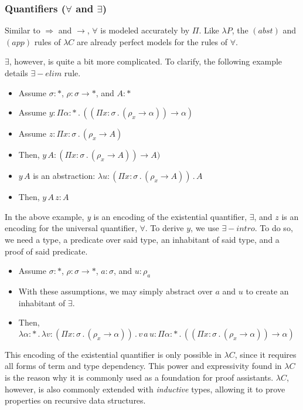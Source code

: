 \documentclass[9pt,preprint,nocopyrightspace,computermodern]{sigplanconf} %
\begin{document}
\subsubsection* {Quantifiers (\(\forall\) and \(\exists\))}
Similar to \(\Rightarrow\) and \(\rightarrow\), \(\forall\) is modeled accurately by
\(\Pi\). Like \(\lambda P\), the \((abst)\) and \((app)\) rules of \(\lambda C\) are
already perfect models for the rules of \(\forall\).

\(\exists\), however, is quite a bit more complicated. To clarify, the following
example details \(\exists\!\!-\!\!elim\) rule.
\begin{itemize}
\item Assume \(\sigma:*\),\(\,\,\rho:\sigma\rightarrow *\), and \(A:*\)
\item Assume \(y:\Pi\alpha:*\,.\,((\Pi x:\sigma\,.\,(\rho_x\rightarrow\alpha))\rightarrow\alpha)\)
\item Assume \(z:\Pi x:\sigma\,.\,(\rho_x\rightarrow A)\)
\item Then, \(y\,A:(\Pi x:\sigma\,.\,(\rho_x\rightarrow A))\rightarrow A)\)
\item \(y\,A\) is an abstraction: \(\lambda u:(\Pi x:\sigma\,.\,(\rho_x\rightarrow A))\,.\,A\)
\item Then, \(y\,A\,z:A\)
\end{itemize}
In the above example, \textit{y} is an encoding of the existential quantifier,
\(\exists\), and \(z\) is an encoding for the universal quantifier, \(\forall\).
To derive \(y\), we use \(\exists\!\!-\!\!intro\). To do so, we need a type,
a predicate over said type, an inhabitant of said type, and a proof of said predicate.
\begin{itemize}
\item Assume \(\sigma:*\),\(\,\,\rho:\sigma\rightarrow *\),\(\,\,a:\sigma\), and \(u:\rho_a\)
\item With these assumptions, we may simply abstract over \(a\) and \(u\) to
  create an inhabitant of \(\exists\).
\item Then, \(\lambda\alpha:*\,.\,\lambda v:(\Pi x:\sigma\,.\,(\rho_x\rightarrow\alpha))\,.\,v\,a\,u :\Pi\alpha:*\,.\,((\Pi x:\sigma\,.\,(\rho_x\rightarrow\alpha))\rightarrow\alpha)\)
\end{itemize}
This encoding of the existential quantifier is only possible in \(\lambda C\),
since it requires all forms of term and type dependency. This power and expressivity
found in \(\lambda C\) is the reason why it is commonly used as a foundation for
proof assistants. \(\lambda C\), however, is also commonly extended with
\textit{inductive} types, allowing it to prove properties on recursive data structures.
\end{document}
